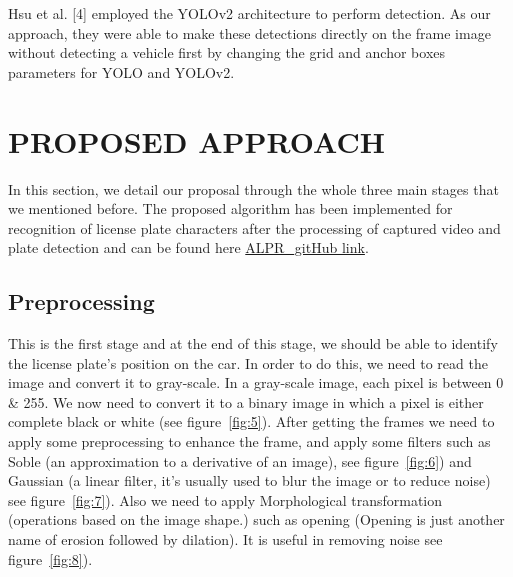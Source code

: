 \documentclass[letterpaper,12pt]{article}
\begin{document}
Hsu et al. [4] employed the YOLOv2 architecture to perform detection. As our approach, they were able to make these detections directly on the frame image without detecting a vehicle first by changing the grid and anchor boxes parameters for YOLO and YOLOv2.

\section{PROPOSED APPROACH}
In this section, we detail our proposal through the whole three main stages that we mentioned before. The proposed algorithm has been implemented for recognition of license plate characters after the processing of captured video and plate detection and can be found here \href{https://github.com/Mkamel104/ALPR }{ALPR\_gitHub link}.

\subsection{Preprocessing}
This is the first stage and at the end of this stage, we should be able to identify the license plate’s position on the car. In order to do this, we need to read the image and convert it to gray-scale. In a gray-scale image, each pixel is between 0 \& 255. We now need to convert it to a binary image in which a pixel is either complete black or white (see figure~\ref{fig:5}). After getting the frames we need to apply some preprocessing to enhance the frame, and apply some filters such as Soble (an approximation to a derivative of an image), see figure~\ref{fig:6}) and Gaussian (a linear filter, it's usually used to blur the image or to reduce noise) see figure~\ref{fig:7}). Also we need to apply Morphological transformation (operations based on the image shape.) such as opening (Opening is just another name of erosion followed by dilation). It is useful in removing noise see figure~\ref{fig:8}).
\end{document}
